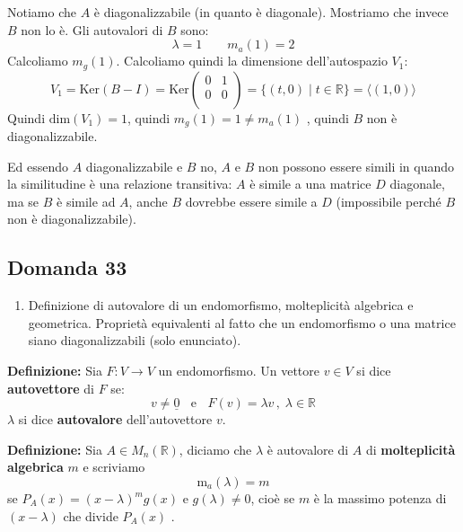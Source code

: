 \documentclass[
  a4paper,
]{article}
\providecommand{\tightlist}{%
  \setlength{\itemsep}{0pt}\setlength{\parskip}{0pt}}
\providecommand{\tightlist}{}
\begin{document}
Notiamo che \(A\) è diagonalizzabile (in quanto è diagonale). Mostriamo
che invece \(B\) non lo è. Gli autovalori di \(B\) sono: \[
\lambda = 1 \qquad m_a(1) = 2
\] Calcoliamo \(m_g(1)\). Calcoliamo quindi la dimensione
dell'autospazio \(V_1\): \[
V_1 = \text{Ker}(B - I) = \text{Ker} \begin{pmatrix}
0 & 1 \\
0 & 0 \\
\end{pmatrix}
= \{(t, 0) \mid t \in \mathbb{R}\} = \langle(1, 0) \rangle
\] Quindi \(\text{dim}(V_1) = 1\), quindi \(m_g(1) = 1 \neq m_a(1)\) ,
quindi \(B\) non è diagonalizzabile.

Ed essendo \(A\) diagonalizzabile e \(B\) no, \(A\) e \(B\) non possono
essere simili in quando la similitudine è una relazione transitiva:
\(A\) è simile a una matrice \(D\) diagonale, ma se \(B\) è simile ad
\(A\), anche \(B\) dovrebbe essere simile a \(D\) (impossibile perché
\(B\) non è diagonalizzabile).

\hypertarget{domanda-33}{%
\subsection{Domanda 33}\label{domanda-33}}

\begin{observationbox}[Domanda]
\begin{enumerate}
\def\labelenumi{\arabic{enumi}.}
\setcounter{enumi}{32}
\tightlist
\item
  Definizione di autovalore di un endomorfismo, molteplicità algebrica e
  geometrica. Proprietà equivalenti al fatto che un endomorfismo o una
  matrice siano diagonalizzabili (solo enunciato).
\end{enumerate}
\end{observationbox}

\textbf{Definizione:} Sia \(F: V \to V\) un endomorfismo. Un vettore
\(v \in V\) si dice \textbf{autovettore} di \(F\) se: \[
v \not = \underline{0} \;\;\text{ e }\;\; F(v) = \lambda v \,,\; \lambda \in \mathbb{R}
\] \(\lambda\) si dice \textbf{autovalore} dell'autovettore \(v\).

\textbf{Definizione:} Sia \(A \in M_n (\mathbb{R})\), diciamo che
\(\lambda\) è autovalore di \(A\) di \textbf{molteplicità algebrica}
\(m\) e scriviamo \[
\text{m}_a(\lambda) = m
\] se \(P_A(x) = (x- \lambda)^m g(x)\) e \(g(\lambda) \not = 0\), cioè
se \(m\) è la massimo potenza di \((x - \lambda)\) che divide \(P_A(x)\)
.
\end{document}
